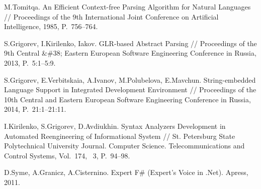 \begin{thebibliography}{99}
 M.Tomitqa. An Efficient Context-free Parsing Algorithm for Natural Languages //
 Proceedings of the 9th International Joint Conference on Artificial Intelligence, 1985, P.~756--764.

 S.Grigorev, I.Kirilenko, Iakov.
 GLR-based Abstract Parsing //
 Proceedings of the 9th Central \&\#38; Eastern European Software Engineering Conference in Russia, 2013, P.~5:1--5:9.

 S.Grigorev, E.Verbitskaia, A.Ivanov, M.Polubelova, E.Mavchun.
 String-embedded Language Support in Integrated Development Environment //
 Proceedings of the 10th Central and Eastern European Software Engineering Conference in Russia, 2014, P.~21:1--21:11.

 I.Kirilenko, S.Grigorev, D.Avdiukhin.
 Syntax Analyzers Development in Automated Reengineering of Informational System //
 St. Petersburg State Polytechnical University Journal. Computer Science. Telecommunications and Control Systems,
 Vol.~174, \textnumero~3, P.~94--98.

 D.Syme, A.Granicz, A.Cisternino. Expert F\# (Expert's Voice in .Net). Apress, 2011.
\end{thebibliography}
